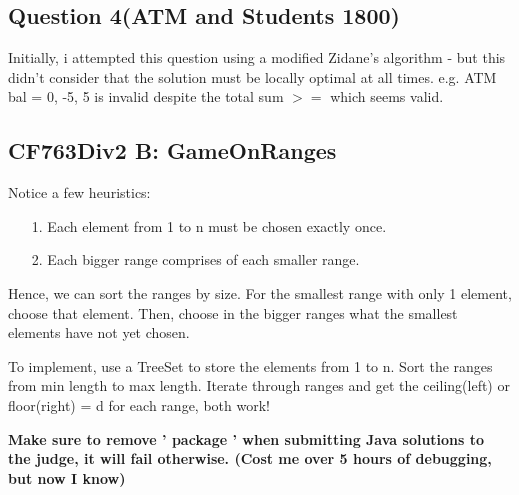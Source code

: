 \documentclass[12pt]{article}
\begin{document}
 \subsection {Question 4(ATM and Students 1800)} 
 
 Initially, i attempted this question using a modified Zidane's algorithm - but this didn't consider that the solution must be locally optimal at all times. 
 e.g. ATM bal = 0, { -5, 5 } is invalid despite the total sum \(>=\) which seems valid. 
 
 \subsection{CF763Div2 B: GameOnRanges}
 Notice a few heuristics: 
 \begin{itemize} 
 	\item[1.] Each element from 1 to n must be chosen exactly once. 
	\item[2.] Each bigger range comprises of each smaller range. 
 \end{itemize} 

Hence, we can sort the ranges by size. 
For the smallest range with only 1 element, choose that element. 
Then, choose in the bigger ranges what the smallest elements have not yet chosen. 

To implement, use a TreeSet to store the elements from 1 to n. 
Sort the ranges from min length to max length. 
Iterate through ranges and get the ceiling(left) or floor(right) = d for each range, both work! 

\textbf{
Make sure to remove ' package ' when submitting Java solutions to the judge, it will fail otherwise. (Cost me over 5 hours of debugging, but now I know) 
} 
 
\end{document}
